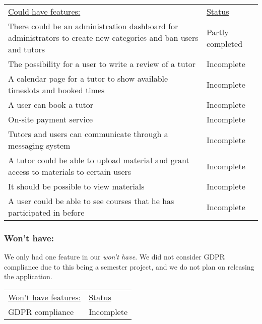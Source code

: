 \begin{table}[h]
    \begin{tabularx}{\textwidth}{|X|l|}
    \underline{Could have features:}                                                                                  & \underline{Status} \\
    There could be an administration dashboard for administrators to create new categories and ban users and tutors   & Partly completed \\
    The possibility for a user to write a review of a tutor                                                           & Incomplete \\
    A calendar page for a tutor to show available timeslots and booked times                                          & Incomplete \\
    A user can book a tutor                                                                                           & Incomplete \\
    On-site payment service                                                                                           & Incomplete \\
    Tutors and users can communicate through a messaging system                                                       & Incomplete \\
    A tutor could be able to upload material and grant access to materials to certain users                           & Incomplete \\
    It should be possible to view materials                                                                           & Incomplete \\
    A user could be able to see courses that he has participated in before                                            & Incomplete \\
\end{tabularx}
\end{table}

\subsubsection{Won't have:}
We only had one feature in our \textit{won't have}. 
We did not consider GDPR compliance due to this being a semester project, and we do not plan on releasing the application.
\begin{table}[h]
    \begin{tabularx}{\textwidth}{|X|l|}
    \underline{Won't have features:}                    & \underline{Status} \\
    GDPR compliance                                     & Incomplete \\
   \end{tabularx}
\end{table}

